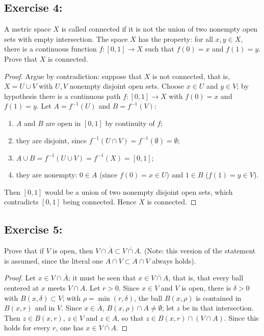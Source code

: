 \documentclass[11pt, a4paper]{article}
\begin{document}
\subsection*{Exercise 4:}

A metric space $X$ is called connected if it is not the union of two nonempty open sets with empty
intersection.
The space $X$ has the property: for all $x, y \in X$, there is a continuous function
$f: [0,1] \to X$ such that $f(0)=x$ and $f(1)=y$.
Prove that $X$ is connected.

\begin{proof}
Argue by contradiction: suppose that $X$ is not connected, that is, $X = U \cup V$ with $U, V$ nonempty
disjoint open sets. Choose $x \in U$ and $y \in V$; by hypothesis there is a continuous path
$f: [0,1] \to X$ with $f(0) = x$ and $f(1) = y$. Let $A = f^{-1}(U)$ and $B = f^{-1}(V)$:
\begin{enumerate}
    \item $A$ and $B$ are open in $[0,1]$ by continuity of $f$;
    \item they are disjoint, since $f^{-1}(U \cap V) = f^{-1}(\emptyset) = \emptyset$;
    \item $A \cup B = f^{-1}(U \cup V) = f^{-1}(X) = [0,1]$;
    \item they are nonempty: $0 \in A$ (since $f(0) = x \in U$) and $1 \in B$ ($f(1) = y \in V$).
\end{enumerate}
Then $[0,1]$ would be a union of two nonempty disjoint open sets, which contradicts $[0,1]$ being
connected. Hence $X$ is connected.
\end{proof}

\subsection*{Exercise 5:}

Prove that if $V$ is open, then $V \cap \overline{A} \subset \overline{V \cap A}$.
(Note: this version of the statement is assumed, since the literal one $A \cap V \subset A \cap V$ always
holds).

\begin{proof}
Let $x \in V \cap \overline{A}$; it must be seen that $x \in \overline{V \cap A}$, that is, that every
ball centered at $x$ meets $V \cap A$. Let $r > 0$. Since $x \in V$ and $V$ is open, there is
$\delta > 0$ with $B(x, \delta) \subset V$; with $\rho = \min(r, \delta)$, the ball $B(x, \rho)$ is
contained in $B(x, r)$ and in $V$. Since $x \in \overline{A}$, $B(x, \rho) \cap A \neq \emptyset$; let
$z$ be in that intersection. Then $z \in B(x, r)$, $z \in V$ and $z \in A$, so that
$z \in B(x, r) \cap (V \cap A)$. Since this holds for every $r$, one has $x \in \overline{V \cap A}$.
\end{proof}
\end{document}
